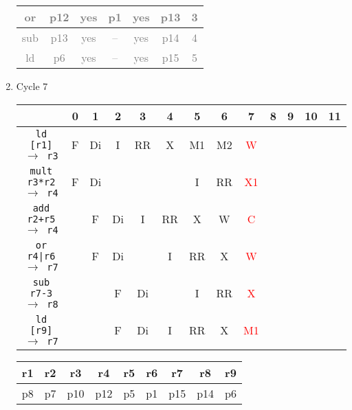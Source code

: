 \documentclass[12pt]{article}
\begin{document}
\begin{enumerate}
\begin{table}[H]
\begin{tabular}{|c|c|c|c|c|c|c|}
					\hline
					\textcolor{gray}{or} & \textcolor{gray}{p12} & \textcolor{gray}{yes} & \textcolor{gray}{p1} & \textcolor{gray}{yes} & \textcolor{gray}{p13} & \textcolor{gray}{3}\\
					\hline
					\textcolor{gray}{sub} & \textcolor{gray}{p13} & \textcolor{gray}{yes} & \textcolor{gray}{--} & \textcolor{gray}{yes} & \textcolor{gray}{p14} & \textcolor{gray}{4}\\
					\hline
					\textcolor{gray}{ld} & \textcolor{gray}{p6} & \textcolor{gray}{yes} & \textcolor{gray}{--} & \textcolor{gray}{yes} & \textcolor{gray}{p15} & \textcolor{gray}{5}\\
					\hline
				\end{tabular}
			\end{table}
		\item
			Cycle 7
			\begin{table}[H]
				\begin{tabular}{|c|c|c|c|c|c|c|c|c|c|c|c|c|}
					\hline
					 & 0 & 1 & 2 & 3 & 4 & 5 & 6 & 7 & 8 & 9 & 10 & 11\\
					\hline
					\texttt{ld [r1] $\rightarrow$ r3} & F & Di & I & RR & X & M1 & M2 & \textcolor{red}{W} &  &  &  &\\
					\hline
					\texttt{mult r3*r2 $\rightarrow$ r4} & F & Di &  &  &  & I & RR & \textcolor{red}{X1} &  &  &  &\\
					\hline
					\texttt{add r2+r5 $\rightarrow$ r4} &  & F & Di & I & RR & X & W & \textcolor{red}{C} &  &  &  &\\
					\hline
					\texttt{or r4|r6 $\rightarrow$ r7} &  & F & Di &  & I & RR & X & \textcolor{red}{W} &  &  &  &\\
					\hline
					\texttt{sub r7-3 $\rightarrow$ r8} &  &  & F & Di &  & I & RR & \textcolor{red}{X} &  &  &  &\\
					\hline
					\texttt{ld [r9] $\rightarrow$ r7} &  &  & F & Di & I & RR & X & \textcolor{red}{M1} &  &  &  &\\
					\hline 
				\end{tabular}
			\end{table}
			\begin{table}[H]
				\begin{tabular}{|c|c|c|c|c|c|c|c|c|}
					\hline
					r1 & r2 & r3 & r4 & r5 & r6 & r7 & r8 & r9\\
					\hline
					p8 & p7 & p10 & p12 & p5 & p1 & p15 & p14 & p6\\
					\hline
				\end{tabular}
			\end{table}

\end{enumerate}
\end{document}

